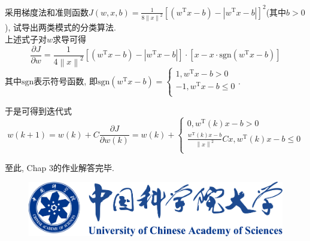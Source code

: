 \documentclass{article}
\begin{document}
\begin{homeworkProblem}
	采用梯度法和准则函数$\displaystyle J\left( w,x,b \right) =\frac{1}{8\left\| x \right\| ^2}\left[ \left( w^{\mathrm{T}}x-b \right) -\left| w^{\mathrm{T}}x-b \right| \right] ^2$(其中$b>0$), 试导出两类模式的分类算法.
	\\

	\solution 上述式子对$w$求导可得$$\frac{\partial J}{\partial w}=\frac{1}{4\left\| x \right\| ^2}\left[ \left( w^{\mathrm{T}}x-b \right) -\left| w^{\mathrm{T}}x-b \right| \right] \cdot \left[ x-x\cdot \mathrm{sgn} \left( w^{\mathrm{T}}x-b \right) \right] 
	$$
	其中$\mathrm{sgn}$表示符号函数, 即$\mathrm{sgn} \left( w^{\mathrm{T}}x-b \right) =\begin{cases}
		1,w^{\mathrm{T}}x-b>0\\
		-1,w^{\mathrm{T}}x-b\le 0\\
	\end{cases}$.

	于是可得到迭代式$$w\left( k+1 \right) =w\left( k \right) +C\frac{\partial J}{\partial w\left( k \right)}=w\left( k \right) +\begin{cases}
		0, w^{\mathrm{T}}\left( k \right) x-b>0\\
		\frac{w^{\mathrm{T}}\left( k \right) x-b}{\left\| x \right\| ^2}Cx, w^{\mathrm{T}}\left( k \right) x-b\le 0\\
	\end{cases}
	$$

	\vspace{3cm}

	至此, Chap 3的作业解答完毕.

	\vspace{3cm}

	\begin{figure}[H]  %
		\centering
		\includegraphics[width=0.6\linewidth]{images/title/ucas_logo 1.pdf}
		\label{fig:ucas-logo}
	\end{figure}
\end{homeworkProblem}


\pagebreak







%
\end{document}

